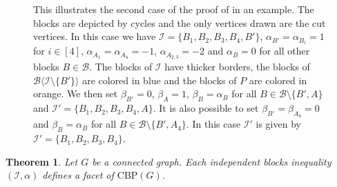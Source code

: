\documentclass[12pt]{amsart}
\newtheorem{theorem}{Theorem}[section]
\newcommand{\CBP}{\mathrm{CBP}}
\newcommand{\I}{\mathcal{I}}
\newcommand{\B}{\mathcal{B}}
\begin{document}
\begin{figure}
    \caption{This illustrates the second case of the proof of  in an example. The blocks are depicted by cycles and the only vertices drawn are the cut vertices. In this case we have $\I=\{B_1,B_2,B_3,B_4,B'\}$, $\alpha_{B'}=\alpha_{B_i}=1$ for $i\in[4]$, $\alpha_{A_1}=\alpha_{A_4}=-1$, $\alpha_{A_{2,3}}=-2$ and $\alpha_B=0$ for all other blocks $B \in \B$. The blocks of $\I$ have thicker borders, the blocks of $\B\langle\I\setminus\{B'\}\rangle$ are colored in blue and the blocks of $P$ are colored in orange. We then set $\beta_{B'}=0$, $\beta_{A}=1$, $\beta_B=\alpha_B$ for all $B \in \B \setminus \{B',A\}$ and $\I'=\{B_1,B_2,B_3,B_4,A\}$. It is also possible to set $\beta_{B'}=\beta_{A_4}=0$ and $\beta_B=\alpha_B$ for all $B \in \B\setminus\{B',A_4\}$. In this case $\I'$ is given by $\I'=\{B_1,B_2,B_3,B_4\}$.}
    \label{fig:Proof}
\end{figure}

\begin{theorem}
    \label{indblockfacet}
    Let $G$ be a connected graph. Each independent blocks inequality $(\I,\alpha)$ defines a facet of $\CBP(G)$.
\end{theorem}
\end{document}

